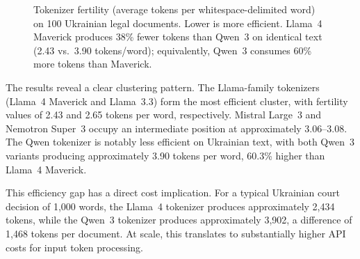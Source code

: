 \documentclass[11pt,a4paper]{article}
\begin{document}
\begin{figure}[t]
\centering
{}
\caption{Tokenizer fertility (average tokens per whitespace-delimited word) on 100 Ukrainian legal documents. Lower is more efficient. Llama~4 Maverick produces 38\% fewer tokens than Qwen~3 on identical text (2.43 vs.\ 3.90 tokens/word); equivalently, Qwen~3 consumes 60\% more tokens than Maverick.}
\label{fig:fertility}
\end{figure}


The results reveal a clear clustering pattern. The Llama-family tokenizers (Llama~4 Maverick and Llama~3.3) form the most efficient cluster, with fertility values of 2.43 and 2.65 tokens per word, respectively. Mistral Large~3 and Nemotron Super~3 occupy an intermediate position at approximately 3.06--3.08. The Qwen tokenizer is notably less efficient on Ukrainian text, with both Qwen~3 variants producing approximately 3.90 tokens per word, 60.3\% higher than Llama~4 Maverick.

This efficiency gap has a direct cost implication. For a typical Ukrainian court decision of 1,000 words, the Llama~4 tokenizer produces approximately 2,434 tokens, while the Qwen~3 tokenizer produces approximately 3,902, a difference of 1,468 tokens per document. At scale, this translates to substantially higher API costs for input token processing.
\end{document}
